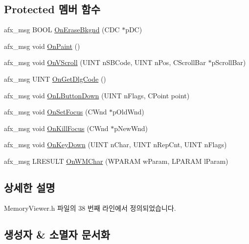 \subsection*{Protected 멤버 함수}
\begin{DoxyCompactItemize}
\item 
afx\+\_\+msg B\+O\+OL \mbox{\hyperlink{class_memory_viewer_a4526960fde4490046ce584462eb26dcb}{On\+Erase\+Bkgnd}} (C\+DC $\ast$p\+DC)
\item 
afx\+\_\+msg void \mbox{\hyperlink{class_memory_viewer_a83e2e0a597c7c25d7fc496411ec1d46f}{On\+Paint}} ()
\item 
afx\+\_\+msg void \mbox{\hyperlink{class_memory_viewer_ab371c01b5cc7069561f448e46e7d44a4}{On\+V\+Scroll}} (U\+I\+NT n\+S\+B\+Code, U\+I\+NT n\+Pos, C\+Scroll\+Bar $\ast$p\+Scroll\+Bar)
\item 
afx\+\_\+msg U\+I\+NT \mbox{\hyperlink{class_memory_viewer_ab33125683b4ca8997d8dda88835512ff}{On\+Get\+Dlg\+Code}} ()
\item 
afx\+\_\+msg void \mbox{\hyperlink{class_memory_viewer_aa17edb0fbc507fe79493ec235cd124f2}{On\+L\+Button\+Down}} (U\+I\+NT n\+Flags, C\+Point point)
\item 
afx\+\_\+msg void \mbox{\hyperlink{class_memory_viewer_a8a245f3c99b525dded9e776a4a5976de}{On\+Set\+Focus}} (C\+Wnd $\ast$p\+Old\+Wnd)
\item 
afx\+\_\+msg void \mbox{\hyperlink{class_memory_viewer_af513c221df2a84b02c4172213cdbeec1}{On\+Kill\+Focus}} (C\+Wnd $\ast$p\+New\+Wnd)
\item 
afx\+\_\+msg void \mbox{\hyperlink{class_memory_viewer_afc4781b16d21212f67e5dd299c537718}{On\+Key\+Down}} (U\+I\+NT n\+Char, U\+I\+NT n\+Rep\+Cnt, U\+I\+NT n\+Flags)
\item 
afx\+\_\+msg L\+R\+E\+S\+U\+LT \mbox{\hyperlink{class_memory_viewer_a47fb6730b742faedeafbb622e008317e}{On\+W\+M\+Char}} (W\+P\+A\+R\+AM w\+Param, L\+P\+A\+R\+AM l\+Param)
\end{DoxyCompactItemize}


\subsection{상세한 설명}


Memory\+Viewer.\+h 파일의 38 번째 라인에서 정의되었습니다.



\subsection{생성자 \& 소멸자 문서화}
\mbox{\label{class_memory_viewer_abb2fe8dcb2bfbf02b714dacc3d46cc55}} 
